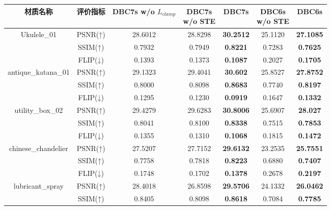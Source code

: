 \begin{table*}[t]
{\begin{tabular}{ccccccc}
        \toprule
        材质名称 & 评价指标 & \makecell{DBC7s \\ w/o $L_{clamp}$} & \makecell{DBC7s \\ w/o STE} & DBC7s & \makecell{DBC6s \\w/o STE} & DBC6s \\
        \midrule
        \multirow{3}{*}{Ukulele\_01}         & PSNR(↑) & 28.6012 & 28.8298 & \textbf{30.2512} & 25.1120 & \textbf{27.1085} \\
                                             & SSIM(↑) & 0.7932 & 0.7949 & \textbf{0.8221} & 0.7283 & \textbf{0.7625} \\
                                             & FLIP(↓) & 0.1393 & 0.1373 & \textbf{0.1087} & 0.2027 & \textbf{0.1705} \\
        \midrule
        \multirow{3}{*}{antique\_katana\_01} & PSNR(↑) & 29.1323 & 29.4041 & \textbf{30.602} & 25.8527 & \textbf{27.8752} \\
                                             & SSIM(↑) & 0.8000 & 0.8098 & \textbf{0.8683} & 0.7740 & \textbf{0.8197} \\
                                             & FLIP(↓) & 0.1295 & 0.1230 & \textbf{0.0919} & 0.1647 & \textbf{0.1332} \\
        \midrule
        \multirow{3}{*}{utility\_box\_02}    & PSNR(↑) & 29.4279 & 29.6283 & \textbf{30.8006} & 25.6907 & \textbf{28.027} \\
                                             & SSIM(↑) & 0.8041 & 0.8100 & \textbf{0.8338} & 0.7515 & \textbf{0.7853} \\
                                             & FLIP(↓) & 0.1355 & 0.1310 & \textbf{0.1068} & 0.1815 & \textbf{0.1472} \\
        \midrule
        \multirow{3}{*}{chinese\_chandelier} & PSNR(↑) & 27.5207 & 27.7152 & \textbf{29.6132} & 23.2535 & \textbf{25.7551} \\
                                             & SSIM(↑) & 0.7758 & 0.7818 & \textbf{0.8223} & 0.6880 & \textbf{0.7407} \\
                                             & FLIP(↓) & 0.1748 & 0.1702 & \textbf{0.1378} & 0.2678 & \textbf{0.2197} \\
        \midrule
        \multirow{3}{*}{lubricant\_spray}    & PSNR(↑) & 28.4018 & 26.8598 & \textbf{29.5706} & 24.1332 & \textbf{26.0462} \\
                                             & SSIM(↑) & 0.8405 & 0.8098 & \textbf{0.8618} & 0.7084 & \textbf{0.7785} \\

\end{tabular}}
\end{table*}

